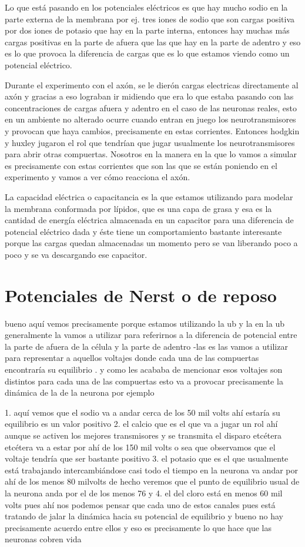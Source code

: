Lo que está pasando en los potenciales eléctricos es que hay mucho sodio en la parte externa de la membrana por ej. tres iones de sodio que son cargas positiva por dos iones de potasio que hay en la parte interna, entonces hay muchas más cargas positivas en la parte de afuera que las que hay en la parte de adentro y eso es lo que provoca  la diferencia de cargas que es lo que estamos viendo como un  potencial eléctrico.

Durante el experimento con el axón, se le dierón cargas electricas directamente al axón y gracias a eso lograban ir midiendo que era lo
que estaba pasando con las concentraciones de cargas afuera y adentro en el caso de las neuronas reales, esto en un ambiente no alterado ocurre cuando entran en juego los neurotransmisores y provocan que haya cambios, precisamente en estas corrientes. Entonces hodgkin y huxley  jugaron el rol que tendrían que jugar usualmente los neurotransmisores para abrir otras compuertas. Nosotros en la manera en la que lo vamos a simular es precisamente con estas corrientes que son las que se están poniendo en el experimento y vamos a ver cómo reacciona el axón. 

La  capacidad eléctrica o capacitancia es la que estamos utilizando para modelar la membrana conformada por lípidos, que es una  capa de grasa y esa es la cantidad de energía eléctrica almacenada en un capacitor para una diferencia de potencial eléctrico dada y éste tiene un comportamiento bastante interesante porque las cargas quedan almacenadas un momento pero se van liberando poco a poco y se va descargando ese capacitor. 

\section{Potenciales de Nerst o de reposo}
bueno aquí vemos precisamente porque estamos utilizando la ub y la en la ub generalmente la vamos a utilizar para referirnos a la diferencia de potencial entre la parte de afuera de la célula y la parte de adentro -las es las vamos a utilizar para representar a aquellos voltajes donde cada una de las compuertas encontraría su equilibrio . y como les acababa de mencionar esos voltajes son distintos para cada una de las compuertas esto va a provocar precisamente la dinámica de la de la neurona por ejemplo 

1. aquí vemos que el sodio va a andar cerca de los 50 mil volts ahí estaría su equilibrio es un valor positivo 
2. el calcio que es el que va a jugar un rol ahí aunque se activen los mejores transmisores y se transmita el disparo etcétera etcétera va a estar por ahí de los 150 mil volts o sea que observamos que el voltaje tendría que ser bastante positivo 
3. el potasio que es el que usualmente está trabajando intercambiándose casi todo el tiempo en la neurona va andar por ahí de los menos 80 milvolts de hecho veremos que el punto de equilibrio usual de la neurona anda por el de los menos 76 y 
4. el del cloro está en menos 60 mil volts pues ahí nos podemos pensar que cada uno de estos canales pues está tratando de jalar la dinámica hacia su potencial de equilibrio y bueno no hay precisamente acuerdo entre ellos y eso es precisamente lo que hace que las neuronas cobren vida

